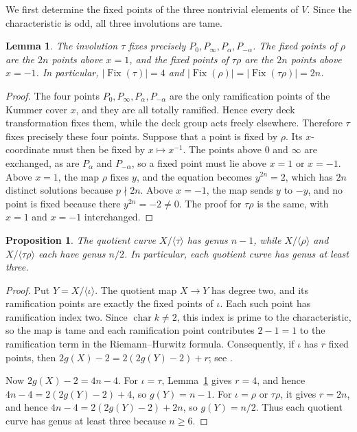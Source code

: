 \documentclass[11pt,reqno]{amsart}
\newtheorem{proposition}[theorem]{Proposition}
\newtheorem{lemma}[theorem]{Lemma}
\theoremstyle{remark}
\newcommand{\Fix}{\operatorname{Fix}}
\begin{document}
We first determine the fixed points of the three nontrivial elements of $V$. Since the characteristic is odd, all three involutions are tame.

\begin{lemma}\label{lem:fixed}
The involution $\tau$ fixes precisely $P_0,P_\infty,P_\alpha,P_{-\alpha}$. The fixed points of $\rho$ are the $2n$ points above $x=1$, and the fixed points of $\tau\rho$ are the $2n$ points above $x=-1$. In particular, $|\Fix(\tau)|=4$ and $|\Fix(\rho)|=|\Fix(\tau\rho)|=2n$.
\end{lemma}

\begin{proof}
The four points $P_0,P_\infty,P_\alpha,P_{-\alpha}$ are the only
ramification points of the Kummer cover $x$, and they are all totally
ramified. Hence every deck transformation fixes them, while the deck
group acts freely elsewhere. Therefore $\tau$ fixes precisely these
four points. Suppose that a point is fixed by $\rho$. Its $x$-coordinate must then be fixed by $x\mapsto x^{-1}$. The points above $0$ and $\infty$ are exchanged, as are $P_\alpha$ and $P_{-\alpha}$, so a fixed point must lie above $x=1$ or $x=-1$. Above $x=1$, the map $\rho$ fixes $y$, and the equation becomes $y^{2n}=2$, which has $2n$ distinct solutions because $p\nmid2n$. Above $x=-1$, the map sends $y$ to $-y$, and no point is fixed because there $y^{2n}=-2\ne0$. The proof for $\tau\rho$ is the same, with $x=1$ and $x=-1$ interchanged.
\end{proof}

\begin{proposition}\label{prop:quotient-genus}
The quotient curve $X/\langle\tau\rangle$ has genus $n-1$, while
$X/\langle\rho\rangle$ and $X/\langle\tau\rho\rangle$ each have genus
$n/2$. In particular, each quotient curve has genus at least three.
\end{proposition}

\begin{proof}
Put $Y=X/\langle\iota\rangle$. The quotient map $X\to Y$ has degree
two, and its ramification points are exactly the fixed points of
$\iota$. Each such point has ramification index two. Since
$\operatorname{char}k\ne2$, this index is prime to the characteristic,
so the map is tame and each ramification point contributes $2-1=1$ to
the ramification term in the Riemann--Hurwitz formula. Consequently, if
$\iota$ has $r$ fixed points, then
$2g(X)-2=2(2g(Y)-2)+r$; see
\cite[Theorem~3.4.13]{Stichtenoth}.

Now $2g(X)-2=4n-4$. For $\iota=\tau$, Lemma~\ref{lem:fixed} gives
$r=4$, and hence $4n-4=2(2g(Y)-2)+4$, so $g(Y)=n-1$.
For $\iota=\rho$ or $\tau\rho$, it gives $r=2n$, and hence
$4n-4=2(2g(Y)-2)+2n$, so $g(Y)=n/2$. Thus each quotient curve has
genus at least three because $n\geq6$.
\end{proof}
\end{document}
